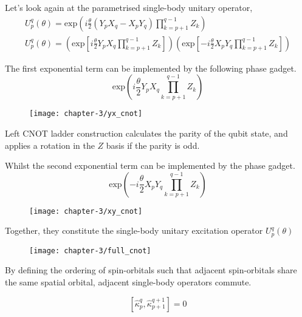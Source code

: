 Let's look again at the parametrised single-body unitary operator,
\begin{equation*}
\begin{gathered}
    U^q_p (\theta) =
    \text{exp} \left( i
    \frac{\theta}{2} (Y_p X_q - X_p Y_q) \prod_{k=p+1}^{q-1} Z_k \right) \\
    U^q_p (\theta) =
    \left( \text{exp} \left[
    i \frac{\theta}{2} Y_p X_q \prod_{k=p+1}^{q-1} Z_k \right] \right)
    \left( \text{exp} \left[ -
    i \frac{\theta}{2} X_p Y_q \prod_{k=p+1}^{q-1} Z_k \right] \right)
\end{gathered}
\end{equation*}

The first exponential term can be implemented by the following phase gadget.
\begin{equation*}
    \text{exp} \left( i
    \frac{\theta}{2} Y_p X_q \prod_{k=p+1}^{q-1} Z_k \right)
\end{equation*}

\begin{figure}[H]
\centering
\texttt{[image: chapter-3/yx\_cnot]}
\end{figure}

Left CNOT ladder construction calculates the parity of the qubit state, and applies a rotation in the $Z$ basis if the parity is odd.

Whilst the second exponential term can be implemented by the phase gadget.
\begin{equation*}
    \text{exp} \left( - i
    \frac{\theta}{2} X_p Y_q \prod_{k=p+1}^{q-1} Z_k \right)
\end{equation*}

\begin{figure}[H]
\centering
    \texttt{[image: chapter-3/xy\_cnot]}
\end{figure}


Together, they constitute the single-body unitary excitation operator $U^q_p (\theta)$

\begin{figure}[H]
\centering
    \texttt{[image: chapter-3/full\_cnot]}
\end{figure}

By defining the ordering of spin-orbitals such that adjacent spin-orbitals share the same spatial orbital, adjacent single-body operators commute.

\begin{equation*}
    \left[ \hat\kappa_p^q, \hat\kappa_{p+1}^{q+1} \right] = 0
\end{equation*}\smallskip

